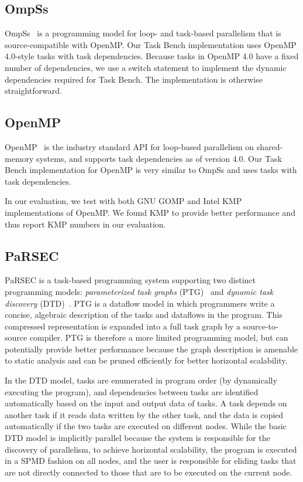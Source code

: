 \subsection{OmpSs}

OmpSs~\cite{OmpSs11} is a programming model for loop- and task-based parallelism
that is source-compatible with OpenMP. Our Task Bench implementation
uses OpenMP 4.0-style tasks with task dependencies. Because tasks in
OpenMP 4.0 have a fixed number of dependencies, we use a switch
statement to implement the dynamic dependencies required for Task
Bench. The implementation is otherwise straightforward.


\subsection{OpenMP}

OpenMP~\cite{OpenMPSpec40} is the industry standard API for loop-based
parallelism on shared-memory systems, and supports task dependencies as of version 4.0. Our Task Bench implementation
for OpenMP is very similar to OmpSs and uses tasks with
task dependencies.

In our evaluation, we test with both GNU GOMP and Intel KMP
implementations of OpenMP. We found KMP to provide better performance
and thus report KMP numbers in our evaluation.


\subsection{PaRSEC}

PaRSEC is a task-based programming system supporting two distinct
programming models: \emph{parameterized task graphs}
(PTG)~\cite{PARSEC13} and \emph{dynamic task discovery}
(DTD)~\cite{PARSEC_DTD}.  PTG is a dataflow model in which programmers
write a concise, algebraic description of the tasks and dataflows in
the program. This compressed representation is expanded into a full
task graph by a source-to-source compiler. PTG is therefore a more
limited programming model, but can potentially provide better
performance because the graph description is amenable to static
analysis and can be pruned efficiently for better horizontal
scalability.

In the DTD model, tasks are enumerated in program order (by
dynamically executing the program), and dependencies between tasks are
identified automatically based on the input and output data of tasks. 
A task depends on another task if it reads data written by the other task,
and the data is copied automatically if the two tasks are executed on
different nodes. While the basic DTD model is implicitly parallel
because the system is responsible for the discovery of parallelism, to
achieve horizontal scalability, the program is executed in a
SPMD fashion on all nodes, and the user is responsible for eliding
tasks that are not directly connected to those that are to be executed
on the current node.

